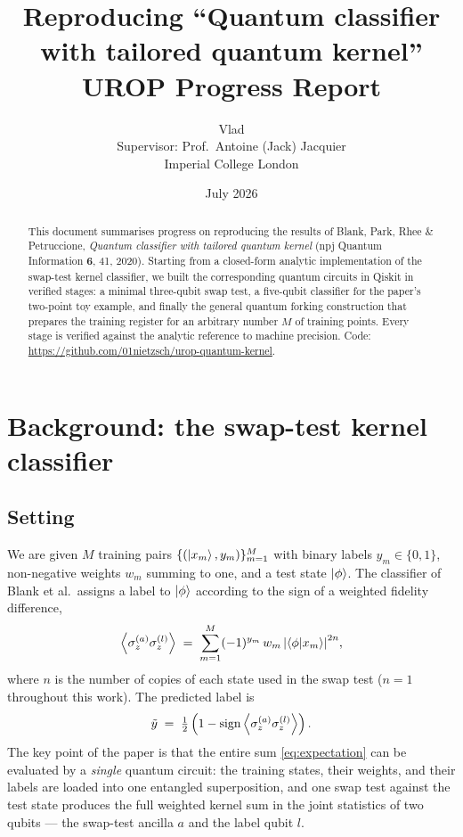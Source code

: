 \documentclass[11pt,a4paper]{article}
\title{Reproducing ``Quantum classifier with tailored quantum kernel''\\
       \large UROP Progress Report}
\author{Vlad \\ \small Supervisor: Prof.\ Antoine (Jack) Jacquier \\
        \small Imperial College London}
\date{July 2026}
\begin{document}
\maketitle

\begin{abstract}
This document summarises progress on reproducing the results of Blank, Park,
Rhee \& Petruccione, \emph{Quantum classifier with tailored quantum kernel}
(npj Quantum Information \textbf{6}, 41, 2020). Starting from a closed-form
analytic implementation of the swap-test kernel classifier, we built the
corresponding quantum circuits in Qiskit in verified stages: a minimal
three-qubit swap test, a five-qubit classifier for the paper's two-point toy
example, and finally the general quantum forking construction that prepares
the training register for an arbitrary number $M$ of training points. Every
stage is verified against the analytic reference to machine precision.
Code: \url{https://github.com/01nietzsch/urop-quantum-kernel}.
\end{abstract}

\section{Background: the swap-test kernel classifier}

\subsection{Setting}

We are given $M$ training pairs $\{(\ket{x_m}, y_m)\}_{m=1}^{M}$ with binary
labels $y_m \in \{0,1\}$, non-negative weights $w_m$ summing to one, and a
test state $\ket{\phi}$. The classifier of Blank et al.\ assigns a label to
$\ket{\phi}$ according to the sign of a weighted fidelity difference,
\begin{equation}
  \label{eq:expectation}
  \expval{\sigma_z^{(a)} \sigma_z^{(l)}}
  \;=\; \sum_{m=1}^{M} (-1)^{y_m}\, w_m\, \abs{\braket{\phi}{x_m}}^{2n},
\end{equation}
where $n$ is the number of copies of each state used in the swap test
($n = 1$ throughout this work). The predicted label is
\begin{equation}
  \tilde{y} \;=\; \tfrac{1}{2}\left(1 - \operatorname{sign}
      \expval{\sigma_z^{(a)} \sigma_z^{(l)}}\right).
\end{equation}
The key point of the paper is that the entire sum \eqref{eq:expectation} can
be evaluated by a \emph{single} quantum circuit: the training states, their
weights, and their labels are loaded into one entangled superposition, and
one swap test against the test state produces the full weighted kernel sum in
the joint statistics of two qubits --- the swap-test ancilla $a$ and the
label qubit $l$.
\end{document}
